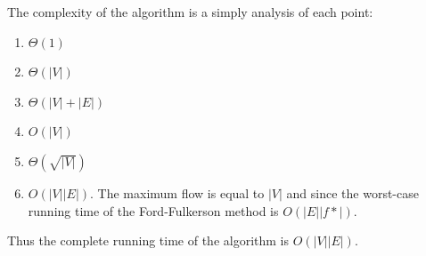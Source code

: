 \documentclass[koma,a4paper]{article}
\begin{document}
The complexity of the algorithm is a simply analysis of each point:

\begin{enumerate}
  \item $\Theta(1)$
  \item $\Theta\left(|V|\right)$
  \item $\Theta\left(|V| + |E|\right)$
  \item $O(|V|)$
  \item $\Theta\left(\sqrt{|V|}\right)$
  \item $O\left(|V||E|\right)$. The maximum flow is equal to $|V|$ and since the worst-case running time of the Ford-Fulkerson method is $O\left(|E||f*|\right)$.
\end{enumerate}

Thus the complete running time of the algorithm is $O\left(|V||E|\right)$.
\end{document}
